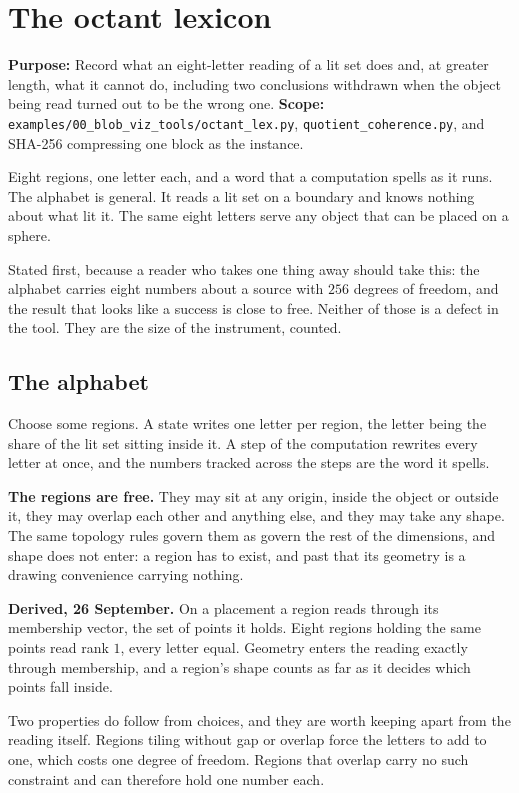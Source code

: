 \chapter{The octant lexicon}

\textbf{Purpose:} Record what an eight-letter reading of a lit set does and, at greater length, what it cannot do, including two conclusions withdrawn when the object being read turned out to be the wrong one. \textbf{Scope:} \texttt{examples/\allowbreak{}00\_blob\_viz\_tools/\allowbreak{}octant\_lex.py}, \texttt{quotient\_coherence.py}, and SHA-256 compressing one block as the instance.

Eight regions, one letter each, and a word that a computation spells as it runs. The alphabet is general. It reads a lit set on a boundary and knows nothing about what lit it. The same eight letters serve any object that can be placed on a sphere.

Stated first, because a reader who takes one thing away should take this: the alphabet carries eight numbers about a source with \(256\) degrees of freedom, and the result that looks like a success is close to free. Neither of those is a defect in the tool. They are the size of the instrument, counted.

\section{The alphabet}

Choose some regions. A state writes one letter per region, the letter being the share of the lit set sitting inside it. A step of the computation rewrites every letter at once, and the numbers tracked across the steps are the word it spells.

\textbf{The regions are free.} They may sit at any origin, inside the object or outside it, they may overlap each other and anything else, and they may take any shape. The same topology rules govern them as govern the rest of the dimensions, and shape does not enter: a region has to exist, and past that its geometry is a drawing convenience carrying nothing.

\textbf{Derived, 26 September.} On a placement a region reads through its membership vector, the set of points it holds. Eight regions holding the same points read rank \(1\), every letter equal. Geometry enters the reading exactly through membership, and a region's shape counts as far as it decides which points fall inside.

Two properties do follow from choices, and they are worth keeping apart from the reading itself. Regions tiling without gap or overlap force the letters to add to one, which costs one degree of freedom. Regions that overlap carry no such constraint and can therefore hold one number each.

